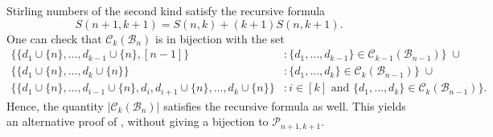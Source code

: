 \documentclass{preprint}
\newcommand{\cB}{\mathcal{B}}
\newcommand{\cC}{\mathcal{C}}
\newcommand{\cP}{\mathcal{P}}
\theoremstyle{definition}
\begin{document}
\begin{remark}\label{rem: boolean lattice recursion}
    Stirling numbers of the second kind satisfy the recursive formula \cite[Equation (6.3)]{Stirling_numbers}
    $$
        S(n+1,k+1)=S(n,k)+(k+1)S(n,k+1).
    $$
    One can check that $\cC_k(\cB_n)$ is in bijection with the set
    \begin{align*}
        \{\{d_1\cup\{n\}, \dots, d_{k-1} \cup \{n\}, [n-1]\}&\colon \{d_1,\dots,d_{k-1}\} \in \cC_{k-1}(\cB_{n-1})\} \;\cup \\ \{\{d_1\cup\{n\},\dots,d_k\cup \{n\}\}&\colon \{d_1,\dots,d_k\} \in \cC_k(\cB_{n-1})\}\;\cup \\ \{\{d_1\cup\{n\}, \dots,d_{i-1}\cup \{n\},d_i, d_{i+1}\cup \{n\},\dots, d_k \cup \{n\}\}&\colon i\in[k] \text{ and }\{d_1,\dots,d_k\} \in \cC_k(\cB_{n-1})\}.
    \end{align*}
    Hence, the quantity $|\cC_k(\cB_n)|$ satisfies the recursive formula as well. This yields an alternative proof of , without giving a bijection to $\cP_{n+1,k+1}$.

\end{remark}
\end{document}
